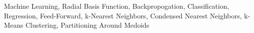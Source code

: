 \documentclass[twoside,11pt]{article}
\begin{document}
	\begin{keywords}
		Machine Learning, Radial Basis Function, Backpropogation, Classification, Regression, Feed-Forward, k-Nearest Neighbors, Condensed Nearest Neighbors, k-Means Clustering, Partitioning Around Medoids
	\end{keywords}
	
	
	
	
	
	
	
	
	
	
	
	
	
	\newpage
	\vskip 0.2in
	
	
\end{document}
